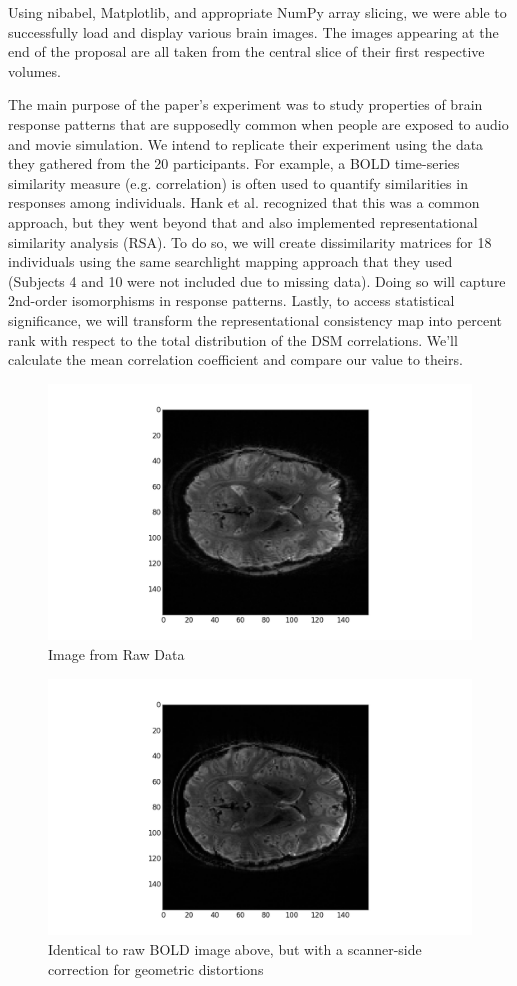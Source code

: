 \documentclass[11pt]{article}
\begin{document}
Using nibabel, Matplotlib, and appropriate NumPy array slicing, we were able to successfully load and display various brain images. The images appearing at the end of the proposal are all taken from the central slice of their first respective volumes.

The main purpose of the paper's experiment was to study properties of brain response
patterns that are supposedly common when people are exposed to audio and movie
simulation. We intend to replicate their experiment using the data they gathered
from the 20 participants. For example, a BOLD time-series similarity measure
(e.g. correlation) is often used to quantify similarities in responses among
individuals. Hank et al. recognized that this was a common approach, but they
went beyond that and also implemented representational similarity analysis (RSA).
To do so, we will create dissimilarity matrices for 18 individuals using the same
searchlight mapping approach that they used (Subjects 4 and 10 were not included
due to missing data). Doing so will capture 2nd-order isomorphisms in response
patterns. Lastly, to access statistical significance, we will transform the
representational consistency map into percent rank with respect to the total
distribution of the DSM correlations. We'll calculate the mean correlation
coefficient and compare our value to theirs.
\begin{figure}[h]
\caption{Image from Raw Data}
\includegraphics[scale=.5]{image_1}
\centering
\end{figure}
\begin{figure}[h]
\caption{Identical to raw BOLD image above, but with a scanner-side correction for geometric
distortions}
\includegraphics[scale=.5]{image_2}
\centering
\end{figure}
\end{document}
